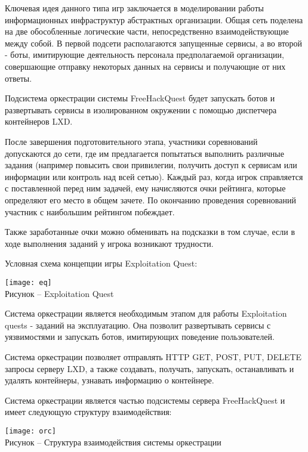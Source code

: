 Ключевая идея данного типа игр заключается в моделировании работы информационных инфраструктур абстрактных организации. Общая сеть поделена на две обособленные логические части, непосредственно взаимодействующие между собой. В первой подсети располагаются запущенные сервисы, а во второй - боты, имитирующие деятельность персонала предполагаемой организации, совершающие отправку некоторых данных на сервисы и получающие от них ответы.\par
Подсистема оркестрации системы FreeHackQuest будет запускать ботов и развертывать сервисы в изолированном окружении с помощью диспетчера контейнеров LXD.\par
После завершения подготовительного этапа, участники соревнований допускаются до сети, где им предлагается попытаться выполнить различные задания (например повысить свои привилегии, получить доступ к сервисам или информации или контроль над всей сетью). Каждый раз, когда игрок справляется с поставленной перед ним задачей, ему начисляются очки рейтинга, которые определяют его место в общем зачете. По окончанию проведения соревнований участник с наибольшим рейтингом побеждает.\par
Также заработанные очки можно обменивать на подсказки в том случае, если в ходе выполнения заданий у игрока возникают трудности.\par
Условная схема концепции игры Exploitation Quest:

\begin{center}
\texttt{[image: eq]}\\
Рисунок -- Exploitation Quest\\
\end{center}
\vspace{\baselineskip}

Система оркестрации является необходимым этапом для работы Exploitation quests - заданий на эксплуатацию. Она позволит развертывать сервисы с уязвимостями и запускать ботов, имитирующих поведение пользователей.\par
Система оркестрации позволяет отправлять HTTP GET, POST, PUT, DELETE запросы серверу LXD, а также создавать, получать, запускать, останавливать и удалять контейнеры, узнавать информацию о контейнере.\par

Система оркестрации является частью подсистемы сервера FreeHackQuest и имеет следующую структуру взаимодействия:
\begin{center}
\texttt{[image: orc]}\\
Рисунок -- Структура взаимодействия системы оркестрации \\
\end{center}
\vspace{\baselineskip}

